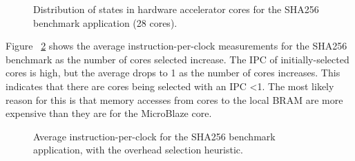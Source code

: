 \documentclass{UoYCSproject}
\begin{document}
\begin{figure}[H]
\caption{Distribution of states in hardware accelerator cores for the SHA256 benchmark application (28 cores).}
\label{fig:statesSHA256-28}
\end{figure}

Figure ~\ref{fig:ipcSHA256} shows the average instruction-per-clock measurements for the SHA256 benchmark as
the number of cores selected increase. The IPC of initially-selected cores
is high, but the average drops to 1 as the number of cores increases. This indicates that
there are cores being selected with an IPC <1. The most likely reason for this is that
memory accesses from cores to the local BRAM are more expensive than they are for the
MicroBlaze core.

\begin{figure}[H]
\caption{Average instruction-per-clock for the SHA256 benchmark application, with the overhead selection heuristic.}
\label{fig:ipcSHA256}
\end{figure}
\end{document}
